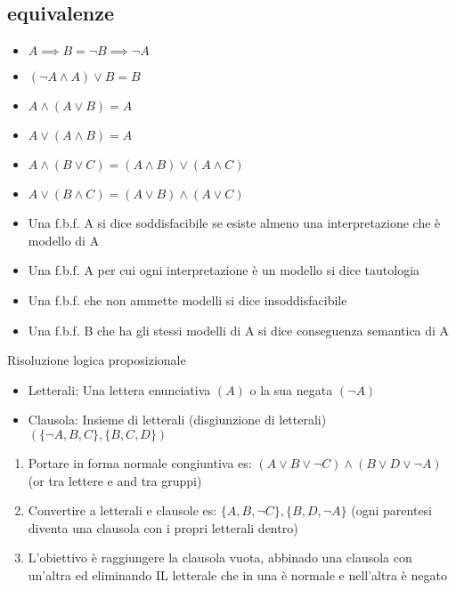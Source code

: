 \documentclass{article}
\begin{document}
\begin{multicols*}{3}
 		\subsection{equivalenze}
 		\begin{itemize}
 			\setlength\itemsep{0.1mm}
 			\item \(A\implies B = \neg B \implies \neg A\)
 			\item \((\neg A \land A)\lor B = B\)
 			\item \(A \land (A \lor B) = A\)
 			\item \(A \lor (A \land B) = A\)
 			\item \(A \land (B \lor C) = (A \land B) \lor (A \land C)\)
 			\item \(A \lor (B \land C) = (A \lor B) \land (A \lor C)\)
 		\end{itemize}
 		
 		\begin{itemize}
 			\setlength\itemsep{0.1mm}
 			\item Una f.b.f. A si dice soddisfacibile se esiste almeno una interpretazione che è modello di A
 			\item Una f.b.f. A per cui ogni interpretazione è un modello si dice tautologia
 			\item Una f.b.f. che non ammette modelli si dice insoddisfacibile 
 			\item Una f.b.f. B che ha gli stessi modelli di A si dice conseguenza semantica di A
 		\end{itemize}
 		
 		{\large Risoluzione logica proposizionale}
 		
 		\begin{itemize}
 			\setlength\itemsep{0.1mm}
 			\item Letterali: Una lettera enunciativa \((A)\) o la sua negata \((\neg A)\)
 			\item Clausola: Insieme di letterali (disgiunzione di letterali) \( (\{\neg A,B,C\},\{B,C,D\}) \)
 		\end{itemize}
 		
 		\begin{enumerate}
 			\setlength\itemsep{0.1mm}
 			\item Portare in forma normale congiuntiva es: \( (A\lor B \lor \neg C) \land (B \lor D \lor \neg A)\) (or tra lettere e and tra gruppi)
 			\item Convertire a letterali e clausole es: \( \{A,B,\neg C\},\{B,D,\neg A\}\) (ogni parentesi diventa una clausola con i propri letterali dentro)
 			\item L'obiettivo è raggiungere la clausola vuota, abbinado una clausola con un'altra ed eliminando IL letterale che in una è normale e nell'altra è negato
 		\end{enumerate}
 	 	

\end{multicols*}
\end{document}
